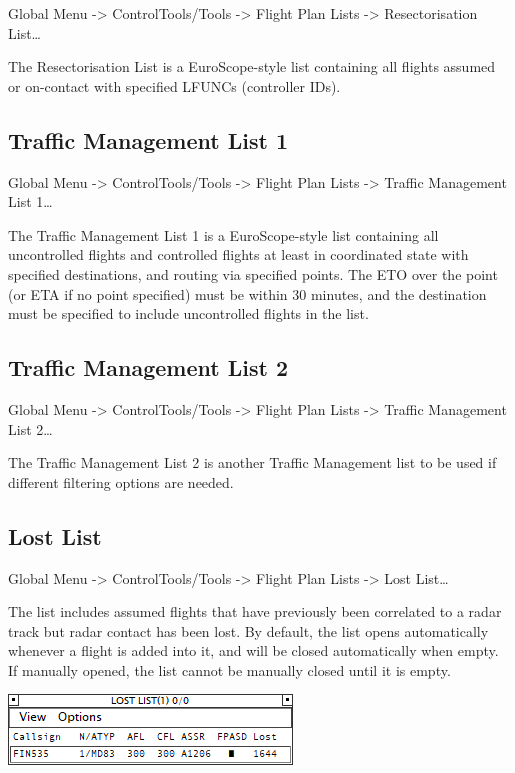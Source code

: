 \documentclass[11pt,a4paper,oldfontcommands]{memoir}
\begin{document}
Global Menu -> ControlTools/Tools -> Flight Plan Lists -> Resectorisation List…

The Resectorisation List is a EuroScope-style list containing all flights assumed or on-contact with specified LFUNCs (controller IDs).

\subsection{Traffic Management List 1}
\label{list:tml1}

Global Menu -> ControlTools/Tools -> Flight Plan Lists -> Traffic Management List 1…

The Traffic Management List 1 is a EuroScope-style list containing all uncontrolled flights and controlled flights at least in coordinated state with specified destinations, and routing via specified points. The ETO over the point (or ETA if no point specified) must be within 30 minutes, and the destination must be specified to include uncontrolled flights in the list.

\subsection{Traffic Management List 2}
\label{list:tml2}

Global Menu -> ControlTools/Tools -> Flight Plan Lists -> Traffic Management List 2…

The Traffic Management List 2 is another Traffic Management list to be used if different filtering options are needed.

\subsection{Lost List}
\label{list:lost}

Global Menu -> ControlTools/Tools -> Flight Plan Lists -> Lost List…

The list includes assumed flights that have previously been correlated to a radar track but radar contact has been lost. By default, the list opens automatically whenever a flight is added into it, and will be closed automatically when empty. If manually opened, the list cannot be manually closed until it is empty.

\includegraphics{img/llist.png}
\end{document}

